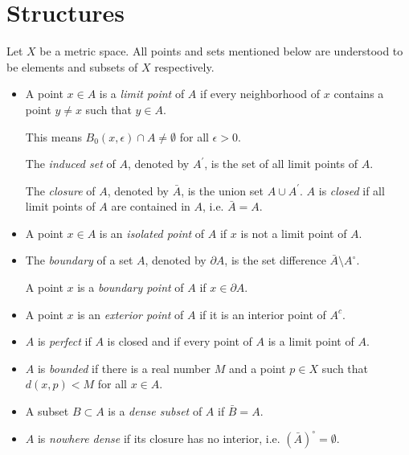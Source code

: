 \section{Structures}
Let $X$ be a metric space. All points and sets mentioned below are understood to be elements and subsets of $X$ respectively.
\begin{itemize}

$A$ is \emph{open} if every point of $A$ is an interior point of $A$, i.e. $A^\circ=A$.

\item A point $x\in A$ is a \emph{limit point} of $A$ if every neighborhood of $x$ contains a point $y \neq x$ such that $y \in A$.

This means $B_0(x,\epsilon) \cap A \neq \emptyset$ for all $\epsilon>0$.

The \emph{induced set} of $A$, denoted by $A^\prime$, is the set of all limit points of $A$.

The \emph{closure} of $A$, denoted by $\bar{A}$, is the union set $A\cup A^\prime$. $A$ is \emph{closed} if all limit points of $A$ are contained in $A$, i.e. $\bar{A}=A$.

\item A point $x \in A$ is an \emph{isolated point} of $A$ if $x$ is not a limit point of $A$.

\item The \emph{boundary} of a set $A$, denoted by $\partial A$, is the set difference $\bar{A}\setminus A^\circ$.

A point $x$ is a \emph{boundary point} of $A$ if $x\in\partial A$.

\item A point $x$ is an \emph{exterior point} of $A$ if it is an interior point of $A^c$.

\item $A$ is \emph{perfect} if $A$ is closed and if every point of $A$ is a limit point of $A$.

\item $A$ is \emph{bounded} if there is a real number $M$ and a point $p \in X$ such that $d(x,p) < M$ for all $x \in A$.

\item A subset $B\subset A$ is a \emph{dense subset} of $A$ if $\bar{B}=A$.

\item $A$ is \emph{nowhere dense} if its closure has no interior, i.e. $(\bar{A})^\circ=\emptyset$.
\end{itemize}

